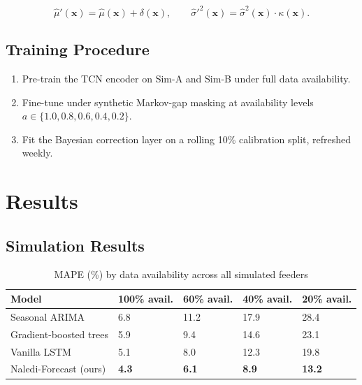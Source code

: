 \documentclass[12pt,a4paper]{report}
\begin{document}
\begin{equation}
\label{eq:correction}
\hat{\mu}'(\mathbf{x}) = \hat{\mu}(\mathbf{x}) + \delta(\mathbf{x}), \qquad
\hat{\sigma}'^2(\mathbf{x}) = \hat{\sigma}^2(\mathbf{x}) \cdot \kappa(\mathbf{x}).
\end{equation}

\section{Training Procedure}
\begin{enumerate}
  \item Pre-train the TCN encoder on Sim-A and Sim-B under full data availability.
  \item Fine-tune under synthetic Markov-gap masking at availability levels
        $a \in \{1.0, 0.8, 0.6, 0.4, 0.2\}$.
  \item Fit the Bayesian correction layer on a rolling 10\% calibration split, refreshed
        weekly.
\end{enumerate}

\chapter{Results}

\section{Simulation Results}
\begin{table}[htbp]
\centering
\caption{MAPE (\%) by data availability across all simulated feeders}
\label{tab:mape-results}
\begin{tabularx}{\linewidth}{@{}lXXXX@{}}
\toprule
\textbf{Model} & \textbf{100\% avail.} & \textbf{60\% avail.} & \textbf{40\% avail.} & \textbf{20\% avail.} \\
\midrule
Seasonal ARIMA & 6.8 & 11.2 & 17.9 & 28.4 \\
Gradient-boosted trees & 5.9 & 9.4 & 14.6 & 23.1 \\
Vanilla LSTM & 5.1 & 8.0 & 12.3 & 19.8 \\
\rowcolor{witssand} Naledi-Forecast (ours) & \textbf{4.3} & \textbf{6.1} & \textbf{8.9} & \textbf{13.2} \\
\bottomrule
\end{tabularx}
\end{table}
\end{document}
